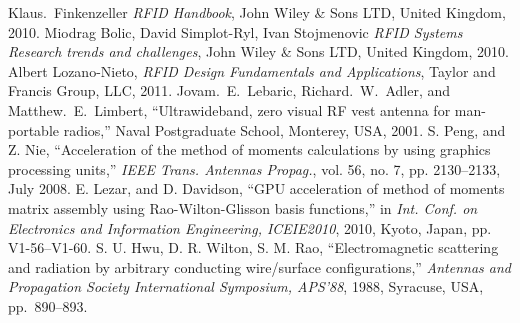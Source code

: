 \begin{thebibliography}{99}
%
Klaus.~Finkenzeller \emph{RFID Handbook}, John Wiley \& Sons LTD, United Kingdom, 2010.
%
Miodrag Bolic, David Simplot-Ryl, Ivan Stojmenovic \emph{RFID Systems Research trends and challenges}, John Wiley \& Sons LTD, United Kingdom, 2010.
%
Albert Lozano-Nieto, \emph{RFID Design Fundamentals and Applications}, Taylor and Francis Group, LLC, 2011.
%
Jovam.~E.~Lebaric, Richard.~W.~Adler, and Matthew.~E.~Limbert, ``Ultrawideband, zero visual RF vest antenna for man-portable radios,'' Naval Postgraduate School, Monterey, USA, 2001. 
%
S. Peng, and Z. Nie, ``Acceleration of the method of moments calculations by using graphics processing units,'' \emph{IEEE Trans. Antennas Propag.}, vol. 56, no. 7, pp. 2130--2133, July 2008.
%
E. Lezar, and D. Davidson, ``GPU acceleration of method of moments
matrix assembly using Rao-Wilton-Glisson basis functions,'' in \emph{Int. Conf.
on Electronics and Information Engineering, ICEIE2010}, 2010, Kyoto,
Japan, pp. V1-56--V1-60.
%
%
S. U. Hwu, D. R. Wilton, S. M. Rao, ``Electromagnetic scattering and radiation by arbitrary conducting wire/surface configurations,'' \emph{Antennas and Propagation Society International Symposium, APS'88}, 1988, Syracuse, USA, pp.~890--893. 
%
\end{thebibliography}
